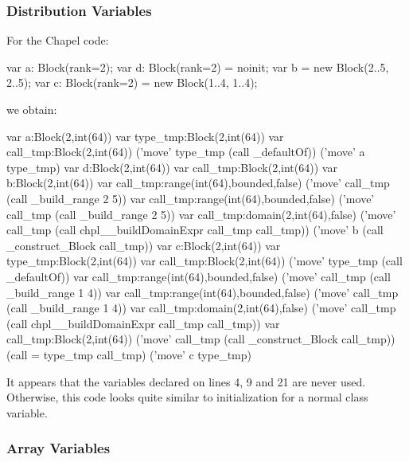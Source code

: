 \subsubsection{Distribution Variables}

For the Chapel code:
\begin{chapel}
var a: Block(rank=2);
var d: Block(rank=2) = noinit;
var b = new Block({2..5, 2..5});
var c: Block(rank=2) = new Block({1..4, 1..4});
\end{chapel}
\noindent
we obtain:
\begin{numberedchapel}
    var a:Block(2,int(64))
    {
      var type_tmp:Block(2,int(64))
      var call_tmp:Block(2,int(64))
      ('move' type_tmp (call _defaultOf))
      ('move' a type_tmp)
    }
    var d:Block(2,int(64))
    var call_tmp:Block(2,int(64))
    var b:Block(2,int(64))
    var call_tmp:range(int(64),bounded,false)
    ('move' call_tmp (call _build_range 2 5))
    var call_tmp:range(int(64),bounded,false)
    ('move' call_tmp (call _build_range 2 5))
    var call_tmp:domain(2,int(64),false)
    ('move' call_tmp (call chpl__buildDomainExpr call_tmp call_tmp))
    ('move' b (call _construct_Block call_tmp))
    var c:Block(2,int(64))
    {
      var type_tmp:Block(2,int(64))
      var call_tmp:Block(2,int(64))
      ('move' type_tmp (call _defaultOf))
      var call_tmp:range(int(64),bounded,false)
      ('move' call_tmp (call _build_range 1 4))
      var call_tmp:range(int(64),bounded,false)
      ('move' call_tmp (call _build_range 1 4))
      var call_tmp:domain(2,int(64),false)
      ('move' call_tmp (call chpl__buildDomainExpr call_tmp call_tmp))
      var call_tmp:Block(2,int(64))
      ('move' call_tmp (call _construct_Block call_tmp))
      (call = type_tmp call_tmp)
      ('move' c type_tmp)
    }
\end{numberedchapel}
\noindent
It appears that the  variables declared on lines 4, 9 and 21 are never
used.  Otherwise, this code looks quite similar to initialization for a normal
class variable.

\subsubsection{Array Variables}


